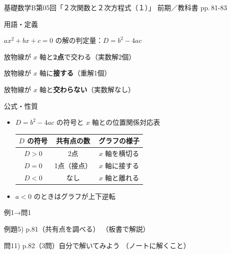 \documentclass[aspectratio=43,professionalfonts,handout]{beamer}
\newcommand{\LectureNum}{05}
\newcommand{\LectureTitle}{２次関数と２次方程式（１）}
\newcommand{\TextPages}{pp.\,81-83}
\newcommand{\CourseName}{基礎数学B}
\renewcommand{\TermName}{前期}
\begin{document}
\begin{frame}{\CourseName\quad 第\LectureNum 回「\LectureTitle 」}
  {\small \TermName\quad \TeacherName\quad ／\quad 教科書 \TextPages}

  \begin{block}{用語・定義}
  \begin{description}[labelwidth=5.5em]
    \item[\kw{判別式 $D$}] $ax^2+bx+c=0$ の解の判定量：$D=b^2-4ac$
    \item[\kw{$D>0$}] 放物線が $x$ 軸と\textbf{2点}で交わる（実数解2個）
    \item[\kw{$D=0$}] 放物線が $x$ 軸に\textbf{接する}（重解1個）
    \item[\kw{$D<0$}] 放物線が $x$ 軸と\textbf{交わらない}（実数解なし）
  \end{description}
  \end{block}
\end{frame}

\begin{frame}{公式・性質}
  \begin{block}{}
  \begin{itemize}
    \item $D=b^2-4ac$ の符号と $x$ 軸との位置関係対応表
    \begin{center}
      \begin{tabular}{ccc}
        \toprule
        $D$ の符号 & 共有点の数 & グラフの様子 \\
        \midrule
        $D>0$ & 2点 & $x$ 軸を横切る \\
        $D=0$ & 1点（接点） & $x$ 軸に接する \\
        $D<0$ & なし & $x$ 軸と離れる \\
        \bottomrule
      \end{tabular}
    \end{center}
    \item $a<0$ のときはグラフが上下逆転
  \end{itemize}
  \end{block}
\end{frame}

\begin{frame}{例1→問1}
  \begin{exampleblock}{例題5) p.81（共有点を調べる）}
    （板書で解説）
  \end{exampleblock}

  \vfill

  \begin{block}{問11) p.82（3問）\quad 自分で解いてみよう}
    （ノートに解くこと）
  \end{block}
\end{frame}
\end{document}
